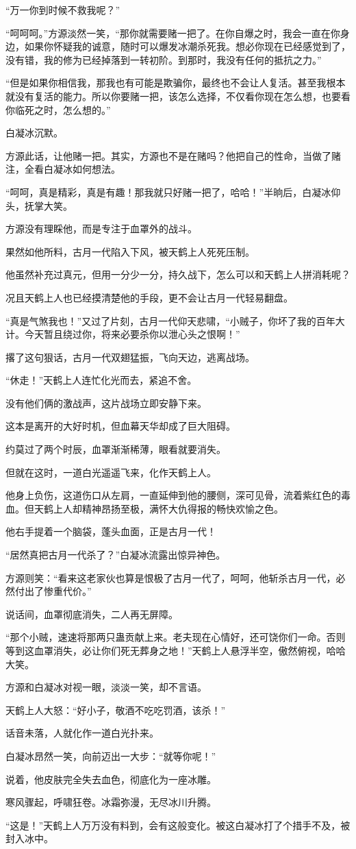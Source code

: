 \begin{this_body}
“万一你到时候不救我呢？”

“呵呵呵。”方源淡然一笑，“那你就需要赌一把了。在你自爆之时，我会一直在你身边，如果你怀疑我的诚意，随时可以爆发冰潮杀死我。想必你现在已经感觉到了，没有错，我的修为已经掉落到一转初阶。到那时，我没有任何的抵抗之力。”

“但是如果你相信我，那我也有可能是欺骗你，最终也不会让人复活。甚至我根本就没有复活的能力。所以你要赌一把，该怎么选择，不仅看你现在怎么想，也要看你临死之时，怎么想的。”

白凝冰沉默。

方源此话，让他赌一把。其实，方源也不是在赌吗？他把自己的性命，当做了赌注，全看白凝冰如何想法。

“呵呵，真是精彩，真是有趣！那我就只好赌一把了，哈哈！”半晌后，白凝冰仰头，抚掌大笑。

方源没有理睬他，而是专注于血罩外的战斗。

果然如他所料，古月一代陷入下风，被天鹤上人死死压制。

他虽然补充过真元，但用一分少一分，持久战下，怎么可以和天鹤上人拼消耗呢？

况且天鹤上人也已经摸清楚他的手段，更不会让古月一代轻易翻盘。

“真是气煞我也！”又过了片刻，古月一代仰天悲啸，“小贼子，你坏了我的百年大计。今天暂且绕过你，将来必要杀你以泄心头之恨啊！”

撂了这句狠话，古月一代双翅猛振，飞向天边，逃离战场。

“休走！”天鹤上人连忙化光而去，紧追不舍。

没有他们俩的激战声，这片战场立即安静下来。

这本是离开的大好时机，但血幕天华却成了巨大阻碍。

约莫过了两个时辰，血罩渐渐稀薄，眼看就要消失。

但就在这时，一道白光遥遥飞来，化作天鹤上人。

他身上负伤，这道伤口从左肩，一直延伸到他的腰侧，深可见骨，流着紫红色的毒血。但天鹤上人却精神昂扬至极，满怀大仇得报的畅快欢愉之色。

他右手提着一个脑袋，蓬头血面，正是古月一代！

“居然真把古月一代杀了？”白凝冰流露出惊异神色。

方源则笑：“看来这老家伙也算是恨极了古月一代了，呵呵，他斩杀古月一代，必然付出了惨重代价。”

说话间，血罩彻底消失，二人再无屏障。

“那个小贼，速速将那两只蛊贡献上来。老夫现在心情好，还可饶你们一命。否则等到这血罩消失，必让你们死无葬身之地！”天鹤上人悬浮半空，傲然俯视，哈哈大笑。

方源和白凝冰对视一眼，淡淡一笑，却不言语。

天鹤上人大怒：“好小子，敬酒不吃吃罚酒，该杀！”

话音未落，人就化作一道白光扑来。

白凝冰昂然一笑，向前迈出一大步：“就等你呢！”

说着，他皮肤完全失去血色，彻底化为一座冰雕。

寒风骤起，呼啸狂卷。冰霜弥漫，无尽冰川升腾。

“这是！”天鹤上人万万没有料到，会有这般变化。被这白凝冰打了个措手不及，被封入冰中。

\end{this_body}

